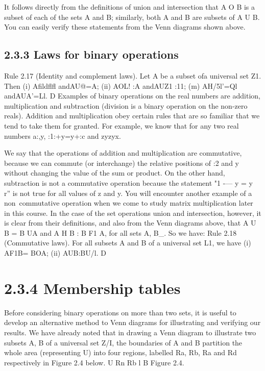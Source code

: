 \documentclass{beamer}
\begin{document}
\begin{frame}
It follows directly from the deﬁnitions of union and intersection that A O B is a subset of each
of the sets A and B; similarly, both A and B are subsets of A U B. You can easily verify these
statements from the Venn diagrams shown above.

\subsection{2.3.3 Laws for binary operations}
Rule 2.17 (Identity and complement laws). Let A be a subset ofa universal set Z1. Then
(i) Aﬁldflﬂ andAU@=A;
(ii) AOL! :A andAUZ1 :11;
(m) AH/5l'=Ql andAUA’=Ll. D
Examples of binary operations on the real numbers are addition, multiplication and subtraction
(division is a binary operation on the non-zero reals). Addition and multiplication obey certain
rules that are so familiar that we tend to take them for granted. For example, we know that for
any two real numbers a:,y,
:1:+y=y+:c and zyzyx.


We say that the operations of addition and multiplication are commutative, because we can
commute (or interchange) the relative positions of :2 and y without changing the value of the sum
or product. On the other hand, subtraction is not a commutative operation because the statement
"1 -— y = y ~ r” is not true for all values of z and y. You will encounter another example of a
non~commutative operation when we come to study matrix multiplication later in this course.
In the case of the set operations union and intersection, however, it is clear from their deﬁnitions,
and also from the Venn diagrams above, that A U B = B UA and A H B : B F1 A, for all sets A, B_.
So we have:
Rule 2.18 (Commutative laws). For all subsets A and B of a universal set L1, we have
(i) AF1B= BOA; (ii) AUB:BU/l. D
\section{2.3.4 Membership tables}
Before considering binary operations on more than two sets, it is useful to develop an alternative
method to Venn diagrams for illustrating and verifying our results.
We have already noted that in drawing a Venn diagram to illustrate two subsets A, B of a universal
set Z/I, the boundaries of A and B partition the whole area (representing U) into four regions,
labelled Ra, Rb, Ra and Rd respectively in Figure 2.4 below.
U
Rn
Rb
l B
Figure 2.4.


\end{frame}
\end{document}
